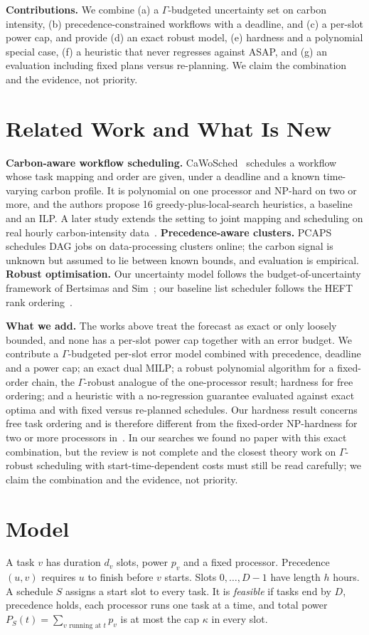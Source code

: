 \documentclass[conference,11pt]{IEEEtran}
\theoremstyle{definition}\newtheorem{remark}{Remark}
\newcommand{\Gm}{\Gamma}
\begin{document}
\textbf{Contributions.} We combine (a) a $\Gm$-budgeted uncertainty set on carbon intensity, (b) precedence-constrained workflows with a deadline, and (c) a per-slot power cap, and provide (d) an exact robust model, (e) hardness and a polynomial special case, (f) a heuristic that never regresses against ASAP, and (g) an evaluation including fixed plans versus re-planning. We claim the combination and the evidence, not priority.

\section{Related Work and What Is New}
\textbf{Carbon-aware workflow scheduling.} CaWoSched~\cite{cawo25} schedules a workflow whose task mapping and order are given, under a deadline and a known time-varying carbon profile. It is polynomial on one processor and NP-hard on two or more, and the authors propose 16 greedy-plus-local-search heuristics, a baseline and an ILP. A later study extends the setting to joint mapping and scheduling on real hourly carbon-intensity data~\cite{cawo26}. \textbf{Precedence-aware clusters.} PCAPS~\cite{pcaps25} schedules DAG jobs on data-processing clusters online; the carbon signal is unknown but assumed to lie between known bounds, and evaluation is empirical. \textbf{Robust optimisation.} Our uncertainty model follows the budget-of-uncertainty framework of Bertsimas and Sim~\cite{bs04}; our baseline list scheduler follows the HEFT rank ordering~\cite{heft02}.

\textbf{What we add.} The works above treat the forecast as exact or only loosely bounded, and none has a per-slot power cap together with an error budget. We contribute a $\Gamma$-budgeted per-slot error model combined with precedence, deadline and a power cap; an exact dual MILP; a robust polynomial algorithm for a fixed-order chain, the $\Gamma$-robust analogue of the one-processor result; hardness for free ordering; and a heuristic with a no-regression guarantee evaluated against exact optima and with fixed versus re-planned schedules. Our hardness result concerns free task ordering and is therefore different from the fixed-order NP-hardness for two or more processors in~\cite{cawo25}. In our searches we found no paper with this exact combination, but the review is not complete and the closest theory work on $\Gamma$-robust scheduling with start-time-dependent costs must still be read carefully; we claim the combination and the evidence, not priority.

\section{Model}\label{sec:model}
A task $v$ has duration $d_v$ slots, power $p_v$ and a fixed processor. Precedence $(u,v)$ requires $u$ to finish before $v$ starts. Slots $0,\dots,D-1$ have length $h$ hours. A schedule $S$ assigns a start slot to every task. It is \emph{feasible} if tasks end by $D$, precedence holds, each processor runs one task at a time, and total power $P_S(t)=\sum_{v\text{ running at }t}p_v$ is at most the cap $\kappa$ in every slot.
\end{document}
